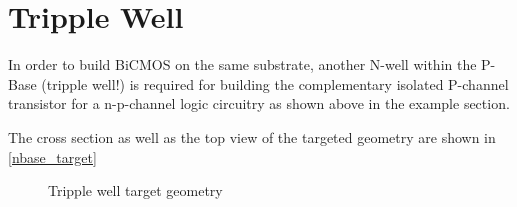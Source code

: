 \section{Tripple Well}\label{tripple_well_chapter}

In order to build BiCMOS on the same substrate, another N-well within the P-Base (tripple well!) is required for building the complementary isolated P-channel transistor for a n-p-channel logic circuitry as shown above in the example section.

The cross section as well as the top view of the targeted geometry are shown in \autoref{nbase_target}

\begin{figure}[H]
	\centering
	\begin{tikzpicture}[node distance = 3cm, auto, thick,scale=\CrossAndTopSectionBig, every node/.style={transform shape}]
		
	\end{tikzpicture}
	\caption{Tripple well target geometry}
	\label{tripple_well_target}
\end{figure}

\newpage

\newpage

\newpage



